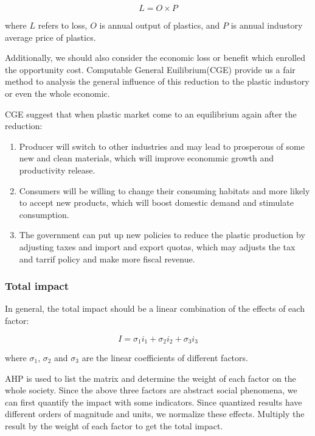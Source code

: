 \documentclass{mcmthesis}
\begin{document}
\begin{equation}
L = O \times P
\end{equation}

where $L$ refers to loss, $O$ is annual output of plastics, and $P$ is annual industory average price of plastics.

Additionally, we should also consider the economic loss or benefit which enrolled the opportunity cost. Computable General Euilibrium(CGE) provide us a fair method to analysis the general influence of this reduction to the plastic industory or even the whole economic. 

CGE suggest that when plastic market come to an equilibrium again after the reduction:

\begin{enumerate}
	\item Producer will switch to other industries and may lead to prosperous of some new and clean materials, which will improve econommic growth and productivity release. 
	\item Consumers will be willing to change their consuming habitats and more likely to accept new products, which will boost domestic demand and stimulate consumption. 
	\item The government can put up new policies to reduce the plastic production by adjusting taxes and import and export quotas, which may adjusts the tax and tarrif policy and make more fiscal revenue. 
\end{enumerate}

\subsubsection{Total impact}

In general, the total impact should be a linear combination of the effects of each factor:

\begin{equation}
I = \sigma _1 i_1 + \sigma_2 i_2 + \sigma_3 i_3 
\end{equation}

where $\sigma_1$, $\sigma_2$ and $\sigma_3$ are the linear coefficients of different factors.

AHP is used to list the matrix and determine the weight of each factor on the whole society. Since the above three factors are abstract social phenomena, we can first quantify the impact with some indicators. Since quantized results have different orders of magnitude and units, we normalize these effects. Multiply the result by the weight of each factor to get the total impact.
\end{document}
